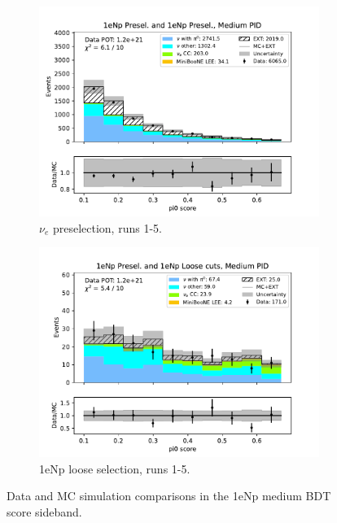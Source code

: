 \begin{figure}[H]
\begin{subfigure}{0.5\linewidth}
        \includegraphics[width=\linewidth]{technote/Sidebands/Figures/NearSideband/near_sideband_pi0_score_run1234a4b4c4d5_NP_NP_MEDIUM_PID.pdf}
        \caption{$\nu_e$ preselection, runs 1-5.}
    \end{subfigure}%
    \begin{subfigure}{0.5\linewidth}
        \includegraphics[width=\linewidth]{technote/Sidebands/Figures/NearSideband/near_sideband_pi0_score_run1234a4b4c4d5_NP_NPL_MEDIUM_PID.pdf}
        \caption{1eNp loose selection, runs 1-5.}
    \end{subfigure}
    \caption{Data and MC simulation comparisons in the 1eNp medium BDT score sideband.}
\end{figure}

